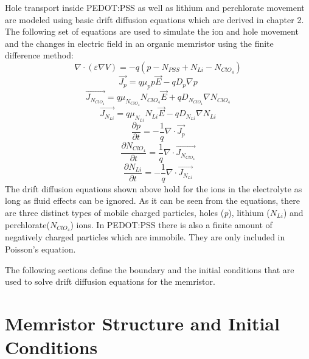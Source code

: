 \begin{doublespace}
Hole transport inside PEDOT:PSS as well as lithium and perchlorate movement are modeled using basic drift diffusion equations which are derived in chapter 2. The following set of equations are used to simulate the ion and hole movement and the changes in electric field in an organic memristor using the finite difference method:
\begin{equation}
\nabla \cdot  (\varepsilon \nabla V)=-q( p-N_{PSS}+ N_{Li} - N_{ClO_{4}})
\end{equation}
\begin{equation}
\vec{J_p}=q\mu_p p \vec{E}-q D_p \nabla p
\end{equation}
\begin{equation}
\vec{J_{N_{ClO_{4}}}}=q\mu_{N_{ClO_{4}}} N_{ClO_{4}} \vec{E}+q D_{N_{ClO_{4}}} \nabla N_{ClO_{4}}
\end{equation}
\begin{equation}
\vec{J_{N_{Li}}}=q\mu_{N_{Li}} N_{Li} \vec{E}-q D_{N_{Li}} \nabla N_{Li}
\end{equation}
\begin{equation}
\frac{\partial p}{\partial t}=-\frac{1}{q}\nabla \cdot \vec{J_p}
\end{equation}
\begin{equation}
\frac{\partial N_{ClO_{4}}}{\partial t}=\frac{1}{q}\nabla \cdot \vec{J_{N_{ClO_{4}}}}
\end{equation}
\begin{equation}
\frac{\partial N_{Li}}{\partial t}=-\frac{1}{q}\nabla \cdot \vec{J_{N_{Li}}}
\end{equation}
The drift diffusion equations shown above hold for the ions in the electrolyte as long as fluid effects can be ignored. As it can be seen from the equations, there are three distinct types of mobile charged particles, holes (\textit{p}), lithium ($N_{Li}$) and perchlorate($N_{ClO_{4}}$) ions. In PEDOT:PSS there is also a finite amount of negatively charged particles which are immobile. They are only included in Poisson's equation.

The following sections define the boundary and the initial conditions that are used to solve drift diffusion equations for the memristor.

\section{Memristor Structure and Initial Conditions}


\end{doublespace}
